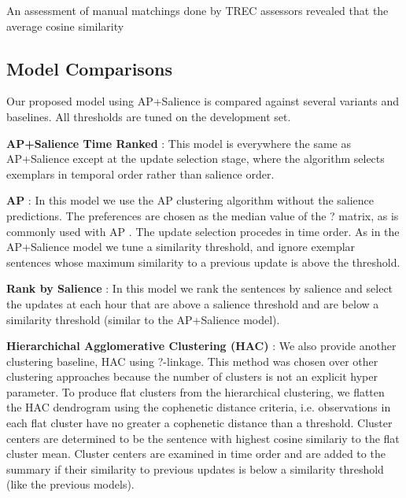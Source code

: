 An assessment of manual matchings done by TREC 
assessors revealed that the average cosine similarity 

\subsection{Model Comparisons}

Our proposed model using AP+Salience is compared against several variants and baselines. All thresholds
are tuned on the development set.

\textbf{AP+Salience Time Ranked} : This model is everywhere the same as AP+Salience except at the update selection stage, 
where the algorithm selects exemplars in temporal order rather than salience order. 

\textbf{AP} : In this model we use the AP clustering algorithm without the salience predictions.
The preferences are chosen as the median value of the ? matrix, as is commonly used with AP \cite{?}.
The update selection procedes in time order. As in the AP+Salience model we tune a similarity threshold,
and ignore exemplar sentences whose maximum similarity to a previous update is above the threshold.

\textbf{Rank by Salience} : In this model we rank the sentences by salience and select the updates at each hour that are
above a salience threshold and are below a similarity threshold (similar to the AP+Salience model). 

\textbf{Hierarchichal Agglomerative Clustering (HAC)} : We also provide another clustering baseline, HAC using ?-linkage. 
This method was chosen over other clustering approaches because the number of clusters 
is not an explicit hyper parameter. To produce flat clusters from the hierarchical clustering, we flatten the HAC dendrogram
using the cophenetic distance criteria, i.e. observations in each flat cluster have no greater a cophenetic distance than a threshold.
Cluster centers are determined to be the sentence with highest cosine similariy to the flat cluster mean.
Cluster centers are examined in time order and are added to the summary if their similarity to previous updates is below a similarity threshold
(like the previous models).


